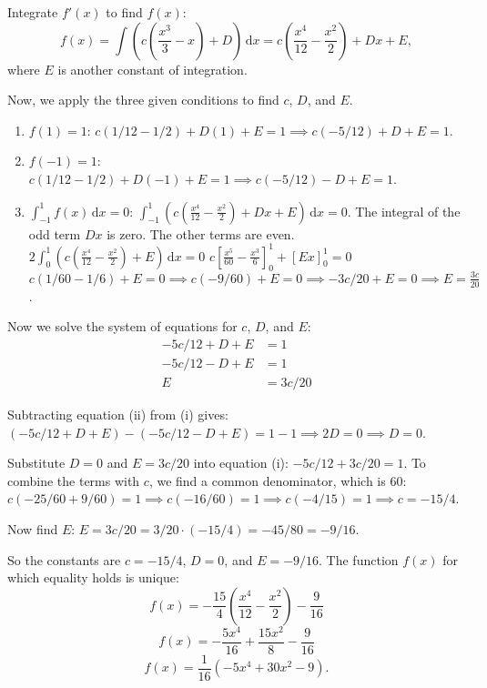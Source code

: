 \documentclass[12pt,a4paper]{article}
\theoremstyle{definition}
\begin{document}
    Integrate $f'(x)$ to find $f(x)$:
    \[
        f(x) = \int \left(c\left(\frac{x^3}{3} - x\right) + D\right)\,\mathrm{d}x = c\left(\frac{x^4}{12} - \frac{x^2}{2}\right) + Dx + E,
    \]
    where $E$ is another constant of integration.

    Now, we apply the three given conditions to find $c$, $D$, and $E$.
    \begin{enumerate}
        \item $f(1) = 1$:
        $c(1/12 - 1/2) + D(1) + E = 1 \implies c(-5/12) + D + E = 1$.

        \item $f(-1) = 1$:
        $c(1/12 - 1/2) + D(-1) + E = 1 \implies c(-5/12) - D + E = 1$.

        \item $\int_{-1}^{1} f(x)\,\mathrm{d}x = 0$:
        $\int_{-1}^{1} \left(c\left(\frac{x^4}{12} - \frac{x^2}{2}\right) + Dx + E\right)\,\mathrm{d}x = 0$.
        The integral of the odd term $Dx$ is zero. The other terms are even.
        $2 \int_{0}^{1} \left(c\left(\frac{x^4}{12} - \frac{x^2}{2}\right) + E\right)\,\mathrm{d}x = 0$
        $c\left[\frac{x^5}{60} - \frac{x^3}{6}\right]_{0}^{1} + [Ex]_{0}^{1} = 0$
        $c(1/60 - 1/6) + E = 0 \implies c(-9/60) + E = 0 \implies -3c/20 + E = 0 \implies E = \frac{3c}{20}$.
    \end{enumerate}

    Now we solve the system of equations for $c$, $D$, and $E$:
    \begin{align}
        -5c/12 + D + E &= 1 \tag{i}\\
        -5c/12 - D + E &= 1 \tag{ii}\\
        E &= 3c/20 \tag{iii}
    \end{align}

    Subtracting equation (ii) from (i) gives:
    $( -5c/12 + D + E ) - ( -5c/12 - D + E ) = 1 - 1 \implies 2D = 0 \implies D=0$.

    Substitute $D=0$ and $E=3c/20$ into equation (i):
    $-5c/12 + 3c/20 = 1$.
    To combine the terms with $c$, we find a common denominator, which is 60:
    $c(-25/60 + 9/60) = 1 \implies c(-16/60) = 1 \implies c(-4/15) = 1 \implies c = -15/4$.

    Now find $E$:
    $E = 3c/20 = 3/20 \cdot (-15/4) = -45/80 = -9/16$.

    So the constants are $c = -15/4$, $D = 0$, and $E = -9/16$.
    The function $f(x)$ for which equality holds is unique:
    \[
        f(x) = -\frac{15}{4}\left(\frac{x^4}{12} - \frac{x^2}{2}\right) - \frac{9}{16}
    \]
    \[
        f(x) = -\frac{5x^4}{16} + \frac{15x^2}{8} - \frac{9}{16}
    \]
    \[
        f(x) = \frac{1}{16}(-5x^4 + 30x^2 - 9).
    \]
\end{document}

